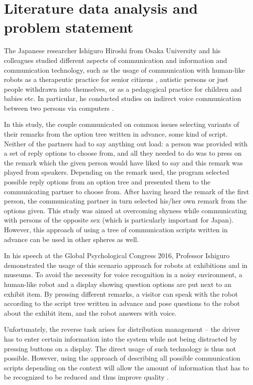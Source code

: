 \section{Literature data analysis and problem statement}

The Japanese researcher Ishiguro Hiroshi from Osaka University and his colleagues studied different aspects of communication and information and communication technology, such as the usage of communication with human-like robots as a therapeutic practice for senior citizens \cite{Nishio_2015}, autistic persons \cite{Kumazaki_2016} or just people withdrawn into themselves, or as a pedagogical practice for children and babies \cite{Park_2015} etc. In particular, he conducted studies on indirect voice communication between two persons via computers \cite{Ishiguro_2016}.

In this study, the couple communicated on common issues selecting variants of their remarks from the option tree written in advance, some kind of script. Neither of the partners had to say anything out load: a person was provided with a set of reply options to choose from, and all they needed to do was to press on the remark which the given person would have liked to say and this remark was played from speakers. Depending on the remark used, the program selected possible reply options from an option tree and presented them to the communicating partner to choose from. After having heard the remark of the first person, the communicating partner in turn selected his/her own remark from the options given. This study was aimed at overcoming shyness while communicating with persons of the opposite sex (which is particularly important for Japan). However, this approach of using a tree of communication scripts written in advance can be used in other spheres as well. 

In his speech at the Global Psychological Congress 2016, Professor Ishiguro demonstrated the usage of this scenario approach for robots at exhibitions and in museums.  To avoid the necessity for voice recognition in a noisy environment, a human-like robot and a display showing question options are put next to an exhibit item. By pressing different remarks, a visitor can speak with the robot according to the script tree written in advance and pose questions to the robot about the exhibit item, and the robot answers with voice. 

Unfortunately, the reverse task arises for distribution management – the driver has to enter certain information into the system while not being distracted by pressing buttons on a display. The direct usage of such technology is thus not possible. However, using the approach of describing all possible communication scripts depending on the context will allow the amount of information that has to be recognized to be reduced and thus improve quality \cite{art2}. 

